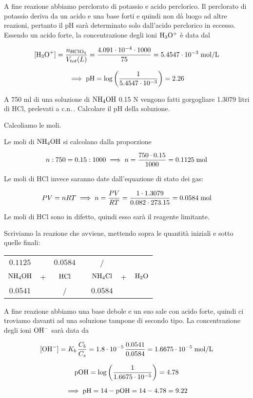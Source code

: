 \begin{soluzione}
A fine reazione abbiamo perclorato di potassio e acido perclorico. Il perclorato di potassio deriva da un acido e una base forti e quindi non dà luogo ad altre reazioni, pertanto il pH sarà determinato solo dall'acido perclorico in eccesso. Essendo un acido forte, la concentrazione degli ioni $\rm H_3O^+$ è data dal

$$[\text{H}_3\text{O}^+]=\frac{n_{\rm HClO_4}}{V_{tot}(L)}=\frac{4.091 \cdot 10^{-4} \cdot 1000}{75}=5.4547 \cdot 10^{-3} \; \rm mol/L$$

$$\implies \rm pH=\log{\left(\frac{1}{5.4547 \cdot 10^{-3}}\right)}=2.26$$
\end{soluzione}

\newpage

\begin{esercizio}
    A 750 ml di una soluzione di $\rm NH_4OH$ 0.15 N vengono fatti gorgogliare 1.3079 litri di HCl, prelevati a c.n.\,. Calcolare il pH della soluzione.
\end{esercizio}
\begin{soluzione}
    Calcoliamo le moli.

Le moli di $\rm NH_4OH$ si calcolano dalla proporzione

$$n:750=0.15:1000
\implies
n=\frac{750 \cdot 0.15}{1000}
=0.1125 \; \rm mol$$

Le moli di HCl invece saranno date dall'equazione di stato dei gas:

$$PV=nRT \implies n=\frac{PV}{RT}
=\frac{1 \cdot 1.3079}{0.082 \cdot 273.15}
=0.0584 \; \rm mol$$

Le moli di HCl sono in difetto, quindi esso sarà il reagente limitante.

Scriviamo la reazione che avviene, mettendo sopra le quantità iniziali e sotto quelle finali:

\begin{center}
    \begin{tabular}{ccccccc}
        $0.1125$ &  & $0.0584$ & & / &&\\
        $\rm NH_4OH$ & + & $\rm HCl$ & \ce{->} & $\rm NH_4Cl$ & + & $\rm H_2O$\\
        $0.0541$ &  & / & & $0.0584$ &&\\
    \end{tabular}
\end{center}

A fine reazione abbiamo una base debole e un suo sale con acido forte, quindi ci troviamo davanti ad una soluzione tampone di secondo tipo. La concentrazione degli ioni $\rm OH^-$ sarà data da

$$[\text{OH}^-]=K_b\,\frac{C_b}{C_s}
=1.8 \cdot 10^{-5}\,\frac{0.0541}{0.0584}
=1.6675 \cdot 10^{-5} \; \rm mol/L$$

$$\rm pOH=\log \left( \frac{1}{1.6675 \cdot 10^{-5}} \right)=4.78$$

$$\implies \rm pH=14-pOH=14-4.78=9.22$$
\end{soluzione}

